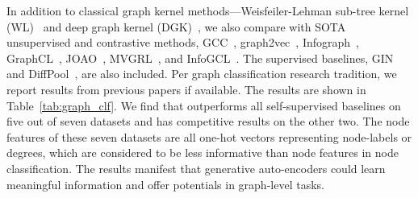 In addition to classical graph kernel methods---Weisfeiler-Lehman sub-tree kernel (WL)~\cite{shervashidze2011weisfeiler} and deep graph kernel (DGK)~\cite{yanardag2015deep}, we also compare \model with SOTA unsupervised and contrastive methods, 
GCC~\cite{qiu2020gcc}, graph2vec~\cite{narayanan2017graph2vec}, Infograph~\cite{sun2019infograph}, GraphCL~\cite{you2020graph}, JOAO~\cite{you2021graph},  MVGRL~\cite{hassani2020contrastive}, and InfoGCL~\cite{Xu2021InfoGCLIG}. 
The supervised baselines, GIN~\cite{xu2019powerful} and DiffPool~\cite{ying2018hierarchical}, are also included. 
Per graph classification research tradition, we report results from previous papers if available.
The results are shown in Table~\ref{tab:graph_clf}.
We find that \model outperforms all self-supervised baselines on five out of seven datasets and has competitive results on the other two.
The node features of these seven datasets are all one-hot vectors representing node-labels or degrees, which are considered to be less informative than node features in node classification. The results manifest that generative auto-encoders could learn meaningful information and offer potentials in graph-level tasks.









